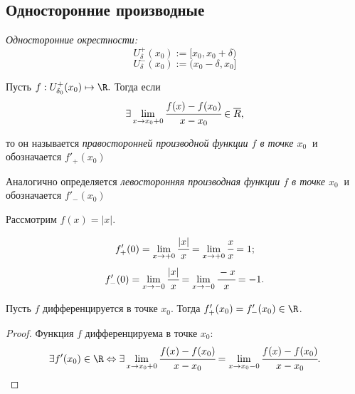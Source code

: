 \subsection{Односторонние производные}
\begin{definition}
    \textit{Односторонние окрестности:}
    $$
    U^{+}_{\delta} (x_{0}) := [x_{0}, x_{0} + \delta) 
    $$
    $$
    U^{-}_{\delta} (x_{0}) := (x_{0} - \delta, x_{0}]
    $$
\end{definition}

\begin{definition}
    Пусть $f:U^{+}_{\delta_{0}} (x_{0}) \mapsto \R.$ Тогда если
    $$\exists \lim\limits_{x \to x_{0} +0} \cfrac{f(x) - f(x_{0})}{x-x_{0}} \in \overline{R},$$

    то он называется \textit{правосторонней производной функции $f$ в точке $x_{0} \ $} и обозначается $f'_{+}(x_{0})$

    Аналогично определяется \textit{левосторонняя производная функции $f$ в точке $x_{0} \ $} и обозначается $f'_{-}(x_{0})$
\end{definition}
\begin{example}
    Рассмотрим $ f(x) = |x|.$

    $$
    f'_{+}(0) = \lim\limits_{x \to +0} \cfrac{|x|}{x} = \lim\limits_{x\to +0} \cfrac{x}{x} = 1;
    $$
    $$
    f'_{-}(0) = \lim\limits_{x \to -0} \cfrac{|x|}{x} = \lim\limits_{x\to -0} \cfrac{-x}{x} = -1.
    $$
\end{example}

\begin{theorem}
    Пусть $f$ дифференцируется в точке $x_{0}$. Тогда $f'_{+}(x_{0}) = f'_{-}(x_{0}) \in \R$. 
\end{theorem}
\begin{proof}
    Функция $f$ дифференцируема в точке $x_{0}$:
    $$
    \exists f'(x_{0}) \in \R \Leftrightarrow \exists \lim\limits_{x \to x_{0} +0}  \cfrac{f(x) - f(x_{0})}{x-x_{0}} = \lim\limits_{x \to x_{0} -0} \cfrac{f(x) - f(x_{0})}{x-x_{0}}.$$
\end{proof}

